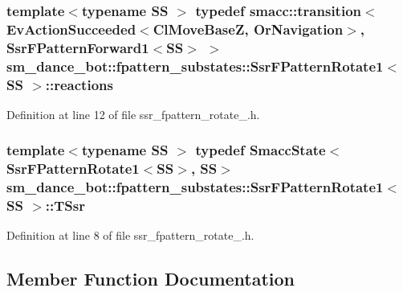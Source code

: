 \subsubsection[{\texorpdfstring{reactions}{reactions}}]{\setlength{\rightskip}{0pt plus 5cm}template$<$typename SS $>$ typedef {\bf smacc\+::transition}$<$Ev\+Action\+Succeeded$<${\bf Cl\+Move\+BaseZ}, {\bf Or\+Navigation}$>$, {\bf Ssr\+F\+Pattern\+Forward1}$<$SS$>$ $>$ {\bf sm\+\_\+dance\+\_\+bot\+::fpattern\+\_\+substates\+::\+Ssr\+F\+Pattern\+Rotate1}$<$ SS $>$\+::{\bf reactions}}\hypertarget{structsm__dance__bot_1_1fpattern__substates_1_1SsrFPatternRotate1_add5b3ec16a787f6318d21b8801aee5ef}{}\label{structsm__dance__bot_1_1fpattern__substates_1_1SsrFPatternRotate1_add5b3ec16a787f6318d21b8801aee5ef}


Definition at line 12 of file ssr\+\_\+fpattern\+\_\+rotate\+\_.\+h.

\subsubsection[{\texorpdfstring{T\+Ssr}{TSsr}}]{\setlength{\rightskip}{0pt plus 5cm}template$<$typename SS $>$ typedef {\bf Smacc\+State}$<${\bf Ssr\+F\+Pattern\+Rotate1}$<$SS$>$, SS$>$ {\bf sm\+\_\+dance\+\_\+bot\+::fpattern\+\_\+substates\+::\+Ssr\+F\+Pattern\+Rotate1}$<$ SS $>$\+::{\bf T\+Ssr}}\hypertarget{structsm__dance__bot_1_1fpattern__substates_1_1SsrFPatternRotate1_ac3c40083e6ee2baf777d0af9639457f2}{}\label{structsm__dance__bot_1_1fpattern__substates_1_1SsrFPatternRotate1_ac3c40083e6ee2baf777d0af9639457f2}


Definition at line 8 of file ssr\+\_\+fpattern\+\_\+rotate\+\_.\+h.



\subsection{Member Function Documentation}
